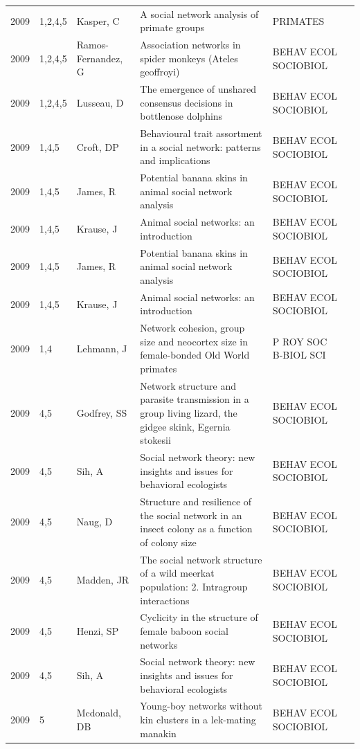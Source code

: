 \documentclass[11pt]{article} %
\begin{document}
\begin{longtable}{p{0.8cm}|p{1.25cm}|p{2.8cm}|p{7.5cm}|p{3cm}l}
2009&	1,2,4,5&	Kasper, C&	 A social network analysis of primate groups&         	PRIMATES\\
2009&	1,2,4,5&	Ramos-Fernandez, G&	 Association networks in spider monkeys (Ateles geoffroyi)&         	BEHAV ECOL SOCIOBIOL\\
2009&	1,2,4,5&	Lusseau, D&	 The emergence of unshared consensus decisions in bottlenose dolphins&         	BEHAV ECOL SOCIOBIOL\\
2009&	1,4,5&	Croft, DP&	 Behavioural trait assortment in a social network: patterns and implications&         	BEHAV ECOL SOCIOBIOL\\
2009&	1,4,5&	James, R&	 Potential banana skins in animal social network analysis&         	BEHAV ECOL SOCIOBIOL\\
2009&	1,4,5&	Krause, J&	 Animal social networks: an introduction&         	BEHAV ECOL SOCIOBIOL\\
2009&	1,4,5&	James, R&	 Potential banana skins in animal social network analysis&         	BEHAV ECOL SOCIOBIOL\\
2009&	1,4,5&	Krause, J&	 Animal social networks: an introduction&         	BEHAV ECOL SOCIOBIOL\\
2009&	1,4&	Lehmann, J&	 Network cohesion, group size and neocortex size in female-bonded Old World primates&         	P ROY SOC B-BIOL SCI\\
2009&	4,5&	Godfrey, SS&	 Network structure and parasite transmission in a group living lizard, the gidgee skink, Egernia stokesii&         	BEHAV ECOL SOCIOBIOL\\
2009&	4,5&	Sih, A&	 Social network theory: new insights and issues for behavioral ecologists&         	BEHAV ECOL SOCIOBIOL\\
2009&	4,5&	Naug, D&	 Structure and resilience of the social network in an insect colony as a function of colony size&         	BEHAV ECOL SOCIOBIOL\\
2009&	4,5&	Madden, JR&	 The social network structure of a wild meerkat population: 2. Intragroup interactions&         	BEHAV ECOL SOCIOBIOL\\
2009&	4,5&	Henzi, SP&	 Cyclicity in the structure of female baboon social networks&         	BEHAV ECOL SOCIOBIOL\\
2009&	4,5&	Sih, A&	 Social network theory: new insights and issues for behavioral ecologists&         	BEHAV ECOL SOCIOBIOL\\
2009&	5&	Mcdonald, DB&	 Young-boy networks without kin clusters in a lek-mating manakin&         	BEHAV ECOL SOCIOBIOL\\

\end{longtable}
\end{document}
